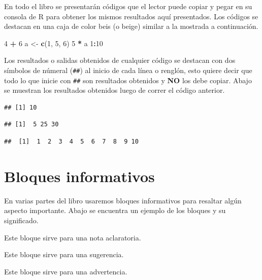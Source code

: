 \documentclass[10pt,]{krantz}
\makeatletter
\newenvironment{Shaded}{\begin{snugshade}}{\end{snugshade}}
\newcommand{\KeywordTok}[1]{\textcolor[rgb]{0.13,0.29,0.53}{\textbf{#1}}}
\newcommand{\DecValTok}[1]{\textcolor[rgb]{0.00,0.00,0.81}{#1}}
\newcommand{\StringTok}[1]{\textcolor[rgb]{0.31,0.60,0.02}{#1}}
\newcommand{\OperatorTok}[1]{\textcolor[rgb]{0.81,0.36,0.00}{\textbf{#1}}}
\newcommand{\NormalTok}[1]{#1}
\let\proglang=\textsf
\newenvironment{kframe}{%
\medskip{}
\setlength{\fboxsep}{.8em}
 \def\at@end@of@kframe{}%
 \ifinner\ifhmode%
  \def\at@end@of@kframe{\end{minipage}}%
  \begin{minipage}{\columnwidth}%
 \fi\fi%
 \def\FrameCommand##1{\hskip\@totalleftmargin \hskip-\fboxsep
 \colorbox{shadecolor}{##1}\hskip-\fboxsep
     \hskip-\linewidth \hskip-\@totalleftmargin \hskip\columnwidth}%
 \MakeFramed {\advance\hsize-\width
   \@totalleftmargin\z@ \linewidth\hsize
   \@setminipage}}%
 {\par\unskip\endMakeFramed%
 \at@end@of@kframe}
\renewenvironment{Shaded}{\begin{kframe}}{\end{kframe}}
\let\BeginKnitrBlock\begin \let\EndKnitrBlock\end
\makeatother
\begin{document}
En todo el libro se presentarán códigos que el lector puede copiar y
pegar en su consola de \proglang{R} para obtener los mismos resultados
aquí presentados. Los códigos se destacan en una caja de color beis (o
beige) similar a la mostrada a continuación.

\begin{Shaded}
\begin{Highlighting}[]
\DecValTok{4} \OperatorTok{+}\StringTok{ }\DecValTok{6}
\NormalTok{a <-}\StringTok{ }\KeywordTok{c}\NormalTok{(}\DecValTok{1}\NormalTok{, }\DecValTok{5}\NormalTok{, }\DecValTok{6}\NormalTok{)}
\DecValTok{5} \OperatorTok{*}\StringTok{ }\NormalTok{a}
\DecValTok{1}\OperatorTok{:}\DecValTok{10}
\end{Highlighting}
\end{Shaded}

Los resultados o salidas obtenidos de cualquier código se destacan con
dos símbolos de númeral (\texttt{\#\#}) al inicio de cada línea o
renglón, esto quiere decir que todo lo que inicie con \texttt{\#\#} son
resultados obtenidos y \textbf{NO} los debe copiar. Abajo se muestran
los resultados obtenidos luego de correr el código anterior.

\begin{verbatim}
## [1] 10
\end{verbatim}

\begin{verbatim}
## [1]  5 25 30
\end{verbatim}

\begin{verbatim}
##  [1]  1  2  3  4  5  6  7  8  9 10
\end{verbatim}

\section*{Bloques informativos}\label{bloques-informativos}


En varias partes del libro usaremos bloques informativos para resaltar
algún aspecto importante. Abajo se encuentra un ejemplo de los bloques y
su significado.

\BeginKnitrBlock{rmdnote}
Este bloque sirve para una nota aclaratoria.
\EndKnitrBlock{rmdnote}

\BeginKnitrBlock{rmdtip}
Este bloque sirve para una sugerencia.
\EndKnitrBlock{rmdtip}

\BeginKnitrBlock{rmdwarning}
Este bloque sirve para una advertencia.
\EndKnitrBlock{rmdwarning}
\end{document}
